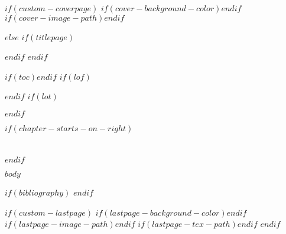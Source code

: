 \documentclass[$if(fontsize)$$fontsize$,$endif$$for(classoption)$$classoption$$sep$,$endfor$]{scrbook}
\newcommand{\AddBackgroundColorLayer}[1]{\AddToShipoutPictureBG{\AtPageLowerLeft{\color{#1}\rule{\paperwidth}{\paperheight}}}}
\newcommand{\AddBackgroundImageLayer}[1]{\AddToShipoutPictureBG{\AtPageCenter{\texttt{[image: \#1]}}}}
\begin{document}
$if(custom-coverpage)$
  \thispagestyle{customPage}
  $if(cover-background-color)$\AddBackgroundColorLayer{coverbgcolor}$endif$
  $if(cover-image-path)$\AddBackgroundImageLayer{$cover-image-path$}$endif$
$else$
  $if(titlepage)$\maketitle$endif$
$endif$

\frontmatter
$if(toc)$\tableofcontents$endif$
$if(lof)$\listoffigures$endif$
$if(lot)$\listoftables$endif$

\mainmatter
$if(chapter-starts-on-right)$\preto\chapter{\cleardoublepage}$endif$

$body$

\backmatter
$if(bibliography)$
  \printbibliography
$endif$

$if(custom-lastpage)$
  \cleardoublepage
  \thispagestyle{customPage}
  $if(lastpage-background-color)$\AddBackgroundColorLayer{lastpagebgcolor}$endif$
  $if(lastpage-image-path)$\AddBackgroundImageLayer{$lastpage-image-path$}$endif$
  $if(lastpage-tex-path)$$endif$
  \clearpage
$endif$
\end{document}

